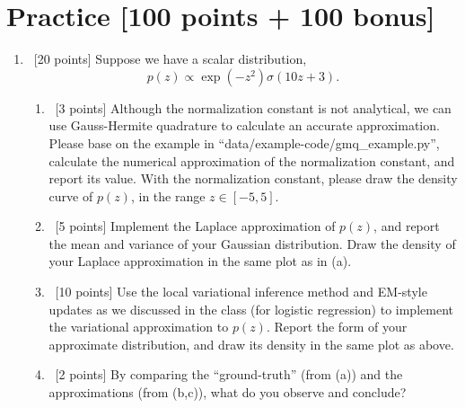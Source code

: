 \documentclass[12pt, fullpage,letterpaper]{article}
\begin{document}
\section*{Practice  [100 points + 100 bonus]}	
\label{sec:q1}
\begin{enumerate}
	\item~[20 points] Suppose we have a scalar distribution, 
	\[
	p(z) \propto \exp(-z^2)\sigma(10z + 3).
	\]
	\begin{enumerate}
		\item~[3 points] Although the normalization constant is not analytical, we can use Gauss-Hermite quadrature to calculate an accurate approximation. Please base on the example in ``data/example-code/gmq\_example.py'', calculate the numerical approximation of the normalization constant, and report its value. With the normalization constant, please draw the density curve of $p(z)$, in the range $z \in [-5, 5]$. 
		\item~[5 points] Implement the Laplace approximation of $p(z)$, and report the mean and variance of your Gaussian distribution. Draw the density of your Laplace approximation in the same plot as in (a). 
		\item~[10 points] Use the local variational inference method and EM-style updates as we discussed in the class (for logistic regression) to implement the variational approximation to $p(z)$. Report the form of your approximate distribution, and draw its density in the same plot as above.
		\item~[2 points] By comparing the ``ground-truth'' (from (a)) and the approximations (from (b,c)), what do you observe and conclude?
	\end{enumerate}


\end{enumerate}
\end{document}
